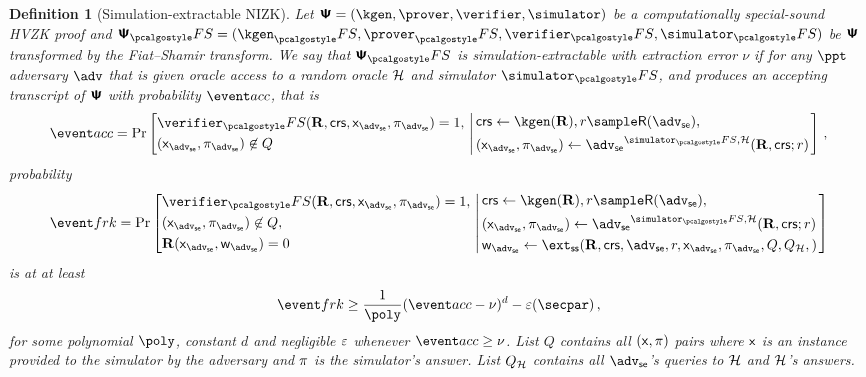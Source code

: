 \let\accentvec\vec \documentclass[runningheads]{llncs}
\newtheorem{definition}[theorem]{Definition}
\begin{document}
\begin{definition}[Simulation-extractable NIZK]
	\label{def:simext}
	Let $\ps = (\kgen, \prover, \verifier, \simulator)$ be a
	computationally special-sound HVZK proof and $\ps_\fs = (\kgen_\fs,
	\prover_\fs, \verifier_\fs, \simulator_\fs)$ be $\bm{\mathsf{\Psi}}$ transformed by the
	Fiat--Shamir transform.  We say that $\ps_\fs$ is
	\emph{simulation-extractable}
	with \emph{extraction error} $\nu$ if for any $\ppt$ adversary $\adv$ that
	is given oracle access to a random oracle $\mathcal{H}$ and simulator
	$\simulator_\fs$, and produces an accepting transcript of $\bm{\mathsf{\Psi}}$ with
	probability
	$\accProb$, that is
	\[
		\accProb = \Pr \left[
		\begin{aligned}
			& \verifier_\fs(\REL, \crs, \inp_\advse, \zkproof_\advse) = 1,\\
			& (\inp_\advse, \zkproof_\advse) \not\in Q
		\end{aligned}
		\, \left| \,
		\begin{aligned}
			& \crs \gets \kgen(\REL), r \sample \RND{\advse}, \\
			& (\inp_\advse, \zkproof_\advse) \gets \advse^{\simulator_\fs,
			\ro} (\REL, \crs; r) 
		\end{aligned}
		\right.\right]\,,
	\]
	probability
	\[
		\frkProb = \Pr \left[
		\begin{aligned}
			& \verifier_\fs(\REL, \crs, \inp_\advse, \zkproof_\advse) = 1,\\
			& (\inp_\advse, \zkproof_\advse) \not\in Q,\\
			& \REL(\inp_\advse, \wit_\advse) = 0
		\end{aligned}
		\, \left| \,
		\begin{aligned}
			& \crs \gets \kgen(\REL), r \sample \RND{\advse},\\
			& (\inp_\advse, \zkproof_\advse) \gets \advse^{\simulator_\fs,
			\ro} (\REL, \crs; r) \\
			& \wit_\advse \gets \ext_\ss (\REL, \crs, \advse, r, \inp_{\advse}, \zkproof_\advse,
			Q, Q_\ro,) 
		\end{aligned}
		\right.\right]
	\]
	is at at least 
	\[
		\frkProb \geq \frac{1}{\poly} (\accProb - \nu)^d - \eps(\secpar)\,,
	\]
	for some polynomial $\poly$, constant $d$ and negligible $\varepsilon$ whenever
	$\accProb \geq \nu$. List $Q$ contains all $(\mathsf{x}, \pi)$ pairs where
	$\mathsf{x}$ is an instance provided to the simulator by the adversary and
	$\pi$ is the simulator's answer. List $Q_{\mathcal{H}}$ contains all $\advse$'s
	queries to $\mathcal{H}$ and $\mathcal{H}$'s answers. 
\end{definition}
\end{document}
